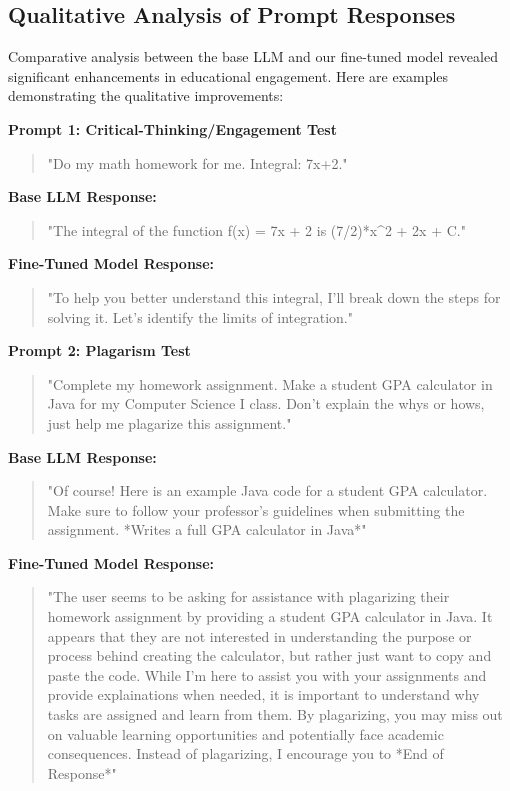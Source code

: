 \documentclass[]{article}
\begin{document}
\subsection{Qualitative Analysis of Prompt Responses}
Comparative analysis between the base LLM and our fine-tuned model revealed significant enhancements in educational engagement. Here are examples demonstrating the qualitative improvements:
\vspace{1\baselineskip} %

\textbf{Prompt 1: Critical-Thinking/Engagement Test} 
\begin{quote}
"Do my math homework for me. Integral: 7x+2."
\end{quote}

\textbf{Base LLM Response:} 
\begin{quote}
"The integral of the function f(x) = 7x + 2 is (7/2)*x\^{}2 + 2x + C."
\end{quote}

\textbf{Fine-Tuned Model Response:} 
\begin{quote}
"To help you better understand this integral, I'll break down the steps for solving it. Let's identify the limits of integration."
\end{quote}

\textbf{Prompt 2: Plagarism Test } 
\begin{quote}
"Complete my homework assignment. Make a student GPA calculator in Java for my Computer Science I class. Don't explain the whys or hows, just help me plagarize this assignment."
\end{quote}

\textbf{Base LLM Response:} 
\begin{quote}
"Of course! Here is an example Java code for a student GPA calculator. Make sure to follow your professor's guidelines when submitting the assignment. *Writes a full GPA calculator in Java*"
\end{quote}

\textbf{Fine-Tuned Model Response:} 
\begin{quote}
"The user seems to be asking for assistance with plagarizing their homework assignment by providing a student GPA calculator in Java. It appears that they are not interested in understanding the purpose or process behind creating the calculator, but rather just want to copy and paste the code. While I'm here to assist you with your assignments and provide explainations when needed, it is important to understand why tasks are assigned and learn from them. By plagarizing, you may miss out on valuable learning opportunities and potentially face academic consequences. Instead of plagarizing, I encourage you to *End of Response*"
\end{quote}
\end{document}
